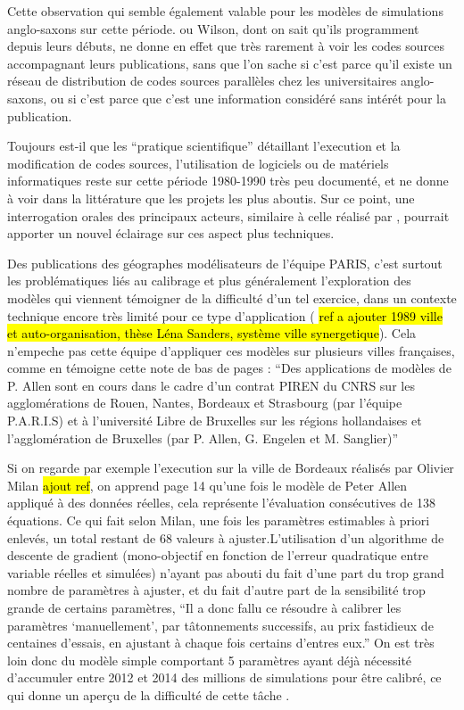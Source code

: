 Cette observation qui semble également valable pour les modèles de simulations anglo-saxons sur cette période. \textcite{Batty2014} ou Wilson, dont on sait qu'ils programment depuis leurs débuts, ne donne en effet que très rarement à voir les codes sources accompagnant leurs publications, sans que l’on sache si c’est parce qu’il existe un réseau de distribution de codes sources parallèles chez les universitaires anglo-saxons, ou si c’est parce que c’est une information considéré sans intérét pour la publication. 

Toujours est-il que les \enquote{pratique scientifique} détaillant l’execution et la modification de codes sources, l'utilisation de logiciels ou de matériels informatiques reste sur cette période 1980-1990 très peu documenté, et ne donne à voir dans la littérature que les projets les plus aboutis. Sur ce point, une interrogation orales des principaux acteurs, similaire à celle réalisé par \textcite{Cuyala2014}, pourrait apporter un nouvel éclairage sur ces aspect plus techniques.

Des publications des géographes modélisateurs de l’équipe PARIS, c’est surtout les problématiques liés au calibrage et plus généralement l’exploration des modèles qui viennent témoigner de la difficulté d’un tel exercice, dans un contexte technique encore très limité pour ce type d’application (\hl{ ref a ajouter 1989 ville et auto-organisation, thèse Léna Sanders, système ville synergetique}). Cela n'empeche pas cette équipe d'appliquer ces modèles sur plusieurs villes françaises, comme en témoigne cette note de bas de pages \autocite[134]{Pumain1984} : \enquote{Des applications de modèles de P. Allen sont en cours dans le cadre d'un contrat PIREN du CNRS sur les agglomérations de Rouen, Nantes, Bordeaux et Strasbourg (par l'équipe P.A.R.I.S) et à l'université Libre de Bruxelles sur les régions hollandaises et l'agglomération de Bruxelles (par P. Allen, G. Engelen et M. Sanglier)}

Si on regarde par exemple l'execution sur la ville de Bordeaux réalisés par Olivier Milan \hl{ajout ref}, on apprend page 14 qu'une fois le modèle de Peter Allen appliqué à des données réelles, cela représente l'évaluation consécutives de 138 équations. Ce qui fait selon Milan, une fois les paramètres estimables à priori enlevés, un total restant de 68 valeurs à ajuster.L'utilisation d'un algorithme de descente de gradient (mono-objectif en fonction de l'erreur quadratique entre variable réelles et simulées) n'ayant pas abouti du fait d'une part du trop grand nombre de paramètres à ajuster, et du fait d'autre part de la sensibilité trop grande de certains paramètres, \enquote{Il a donc fallu ce résoudre à calibrer les paramètres \enquote{manuellement}, par tâtonnements successifs, au prix fastidieux de centaines d'essais, en ajustant à chaque fois certains d'entres eux.}  On est très loin donc du modèle simple comportant 5 paramètres ayant déjà nécessité d'accumuler entre 2012 et 2014 des millions de simulations pour être calibré, ce qui donne un aperçu de la difficulté de cette tâche \autocite{Schmitt2015}.

